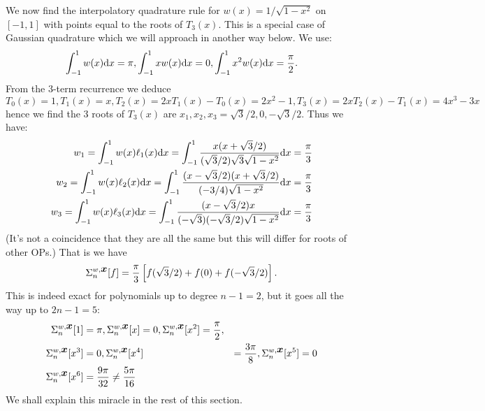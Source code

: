 \begin{example} We now find the interpolatory quadrature rule for $w(x) = 1/\sqrt{1-x^2}$ on $[-1,1]$ with points equal to the roots of $T_3(x)$.  This is a special case of Gaussian quadrature which we will approach in another way below. We use:
\[
\int_{-1}^1 w(x) {\rm d}x = \ensuremath{\pi}, \int_{-1}^1 xw(x) {\rm d}x = 0, \int_{-1}^1 x^2 w(x) {\rm d}x = {\ensuremath{\pi} \over 2}.
\]
From the 3-term recurrence we deduce
\[
T_0(x) = 1, T_1(x) =x, T_2(x) = 2x T_1(x) - T_0(x) = 2x^2-1, T_3(x) = 2x T_2(x) - T_1(x) = 4x^3-3x
\]
hence we find the 3 roots of $T_3(x)$ are $x_1,x_2,x_3 = \sqrt{3}/2,0,-\sqrt{3}/2$. Thus we have:
\begin{align*}
w_1 = \int_{-1}^1 w(x) \ensuremath{\ell}_1(x) {\rm d}x = \int_{-1}^1 {x(x+\sqrt{3}/2) \over (\sqrt{3}/2) \sqrt{3} \sqrt{1-x^2}}{\rm d}x = {\ensuremath{\pi} \over 3} \\
w_2 = \int_{-1}^1 w(x) \ensuremath{\ell}_2(x) {\rm d}x = \int_{-1}^1 {(x-\sqrt{3}/2)(x+\sqrt{3}/2) \over (-3/4)\sqrt{1-x^2}}{\rm d}x = {\ensuremath{\pi} \over 3} \\
w_3 = \int_{-1}^1 w(x) \ensuremath{\ell}_3(x) {\rm d}x = \int_{-1}^1 {(x-\sqrt{3}/2) x \over (-\sqrt{3})(-\sqrt{3}/2) \sqrt{1-x^2}}{\rm d}x = {\ensuremath{\pi} \over 3}
\end{align*}
(It's not a coincidence that they are all the same but this will differ for roots of other OPs.)  That is we have
\[
\ensuremath{\Sigma}_n^{w,\ensuremath{\bm{\x}}}[f]  = {\ensuremath{\pi} \over 3}\br[ f(\sqrt{3}/2) + f(0) + f(-\sqrt{3}/2) ].
\]
This is indeed exact for polynomials up to degree $n-1=2$, but it goes all the way up to $2n-1 = 5$:
\begin{align*}
\Sigma_n^{w,\bm{{\mbox{\boldmath$x$\unboldmath}}}}[1] &= \pi, \Sigma_n^{w,\bm{{\mbox{\boldmath$x$\unboldmath}}}}[x] = 0, \Sigma_n^{w,\bm{{\mbox{\boldmath$x$\unboldmath}}}}[x^2] = {\pi \over 2}, \\
\Sigma_n^{w,\bm{{\mbox{\boldmath$x$\unboldmath}}}}[x^3] &= 0, \Sigma_n^{w,\bm{{\mbox{\boldmath$x$\unboldmath}}}}[x^4] &= {3 \pi \over 8}, \Sigma_n^{w,\bm{{\mbox{\boldmath$x$\unboldmath}}}}[x^5] = 0 \\
\Sigma_n^{w,\bm{{\mbox{\boldmath$x$\unboldmath}}}}[x^6] &= {9 \pi \over 32} \neq {5 \ensuremath{\pi} \over 16}
\end{align*}
We shall explain this miracle in the rest of this section. \end{example}

